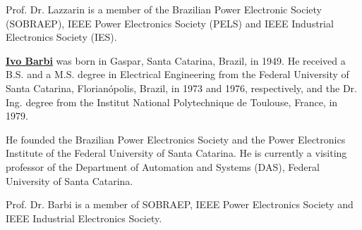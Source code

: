 \documentclass[english]{sobraep}
\begin{document}
Prof. Dr. Lazzarin is a member of the Brazilian Power Electronic Society (SOBRAEP), IEEE Power Electronics Society (PELS) and IEEE Industrial
Electronics Society (IES). 

\vspace{5mm}

\textbf{\underline{Ivo Barbi}} was born in Gaspar, Santa Catarina, Brazil, in 1949. He received a B.S. and a M.S. degree in Electrical Engineering from the Federal University of Santa Catarina, Florianópolis, Brazil, in 1973 and 1976, respectively, and the Dr. Ing. degree from the Institut National Polytechnique de Toulouse, France, in 1979.

He founded the Brazilian Power Electronics Society and the Power Electronics Institute of the Federal University of Santa Catarina.
He is currently a visiting professor of the Department of Automation and Systems (DAS), Federal University of Santa Catarina.

Prof. Dr. Barbi is a member of SOBRAEP, IEEE Power Electronics Society and IEEE Industrial Electronics Society.
\end{document}
